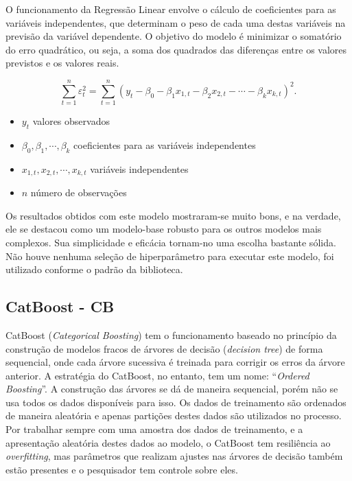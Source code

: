 O funcionamento da Regressão Linear envolve o cálculo de coeficientes para as variáveis independentes, que determinam o peso de cada uma destas variáveis na previsão da variável dependente. O objetivo do modelo é minimizar o somatório do erro quadrático, ou seja, a soma dos quadrados das diferenças entre os valores previstos e os valores reais.\cite{hyndman_fpp3_2024c}

\begin{equation}
	\sum_{t=1}^n \varepsilon_t^2 = \sum_{t=1}^n (y_t -
	\beta_{0} - \beta_{1} x_{1,t} - \beta_{2} x_{2,t} - \cdots - \beta_{k} x_{k,t})^2.
\end{equation}
\begin{itemize}
	\item $y_t$ valores observados
	\item $\beta_{0} , \beta_{1} , \cdots , \beta_{k}$ coeficientes para as variáveis independentes
	\item $x_{1,t} , x_{2,t} , \cdots , x_{k,t}$ variáveis independentes
	\item $n$ número de observações
\end{itemize}

Os resultados obtidos com este modelo mostraram-se muito bons, e na verdade, ele se destacou como um modelo-base robusto para os outros modelos mais complexos. Sua simplicidade e eficácia tornam-no uma escolha bastante sólida. Não houve nenhuma seleção de hiperparâmetro para executar este modelo, foi utilizado conforme o padrão da biblioteca.

\subsection{CatBoost - CB}

CatBoost (\textit{Categorical Boosting}) tem o funcionamento baseado no princípio da construção de modelos fracos de árvores de decisão (\textit{decision tree}) de forma sequencial, onde cada árvore sucessiva é treinada para corrigir os erros da árvore anterior. A estratégia do CatBoost, no entanto, tem um nome: ``\textit{Ordered Boosting}''. A construção das árvores se dá de maneira sequencial, porém não se usa todos os dados disponíveis para isso. Os dados de treinamento são ordenados de maneira aleatória e apenas partições destes dados são utilizados no processo. Por trabalhar sempre com uma amostra dos dados de treinamento, e a apresentação aleatória destes dados ao modelo, o CatBoost tem resiliência ao \textit{overfitting}, mas parâmetros que realizam ajustes nas árvores de decisão também estão presentes e o pesquisador tem controle sobre eles.\cite{catboost_docs}\cite{dorogush2018catboost}\cite{prokhorenkova2018catboost}

